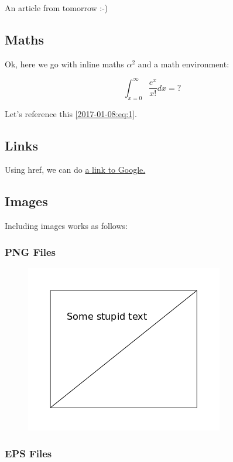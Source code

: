 
An article from tomorrow :-)

\subsection{Maths}

Ok, here we go with inline maths $\alpha^2$ and a math environment:

\begin{equation}
\label{2017-01-08:eq:1}
\int_{x=0}^\infty \frac{e^x}{x!} dx = ?
\end{equation}

Let's reference this \eqref{2017-01-08:eq:1}.

\subsection{Links}

Using href, we can do \href{http://www.google.at}{a link to Google.}

\subsection{Images}

Including images works as follows:

\subsubsection{PNG Files}

\begin{figure}[H]
    \includegraphics[scale=0.5]{images/drawing.png}
\end{figure}

\subsubsection{EPS Files}

